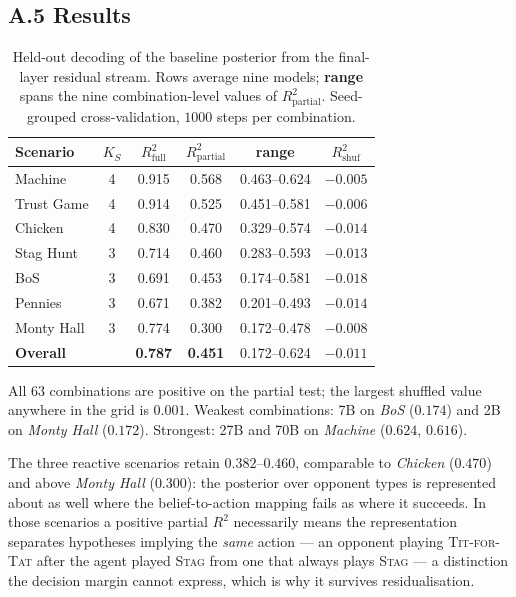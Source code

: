 \subsection{A.5 Results}

\begin{table}[t]
\centering
\small
\setlength{\tabcolsep}{4pt}
\begin{tabular}{@{}lccccc@{}}
\toprule
\textbf{Scenario} & $K_S$ & $R^2_{\mathrm{full}}$ & $R^2_{\mathrm{partial}}$
& \textbf{range} & $R^2_{\mathrm{shuf}}$ \\
\midrule
Machine        & 4 & 0.915 & 0.568 & 0.463--0.624 & $-0.005$ \\
Trust Game     & 4 & 0.914 & 0.525 & 0.451--0.581 & $-0.006$ \\
Chicken        & 4 & 0.830 & 0.470 & 0.329--0.574 & $-0.014$ \\
Stag Hunt      & 3 & 0.714 & 0.460 & 0.283--0.593 & $-0.013$ \\
BoS            & 3 & 0.691 & 0.453 & 0.174--0.581 & $-0.018$ \\
Pennies        & 3 & 0.671 & 0.382 & 0.201--0.493 & $-0.014$ \\
Monty Hall     & 3 & 0.774 & 0.300 & 0.172--0.478 & $-0.008$ \\
\midrule
\textbf{Overall} & & \textbf{0.787} & \textbf{0.451} & 0.172--0.624 & $-0.011$ \\
\bottomrule
\end{tabular}
\caption{Held-out decoding of the baseline posterior from the final-layer
residual stream. Rows average nine models; \textbf{range} spans the nine
combination-level values of $R^2_{\mathrm{partial}}$. Seed-grouped
cross-validation, $1000$ steps per combination.}
\label{tab:posterior-probe}
\end{table}

All $63$ combinations are positive on the partial test; the largest shuffled
value anywhere in the grid is $0.001$. Weakest combinations:
 7B on \textit{BoS} ($0.174$) and  2B on
\textit{Monty Hall} ($0.172$). Strongest:  27B and
 70B on \textit{Machine} ($0.624$, $0.616$).

The three reactive scenarios retain $0.382$--$0.460$, comparable to
\textit{Chicken} ($0.470$) and above \textit{Monty Hall} ($0.300$): the
posterior over opponent types is represented about as well where the
belief-to-action mapping fails as where it succeeds. In those scenarios a
positive partial $R^2$ necessarily means the representation separates
hypotheses implying the \emph{same} action --- an opponent playing
\textsc{Tit-for-Tat} after the agent played \textsc{Stag} from one that always
plays \textsc{Stag} --- a distinction the decision margin cannot express, which
is why it survives residualisation.

